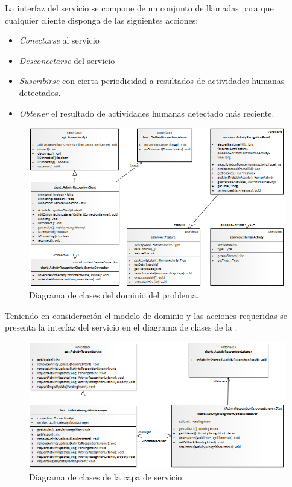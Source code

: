 La interfaz del servicio se compone de un conjunto de llamadas para
que cualquier cliente disponga de las siguientes acciones:
\begin{itemize}
\item \emph{Conectarse} al servicio
\item \emph{Desconectarse} del servicio
\item \emph{Suscribirse} con cierta periodicidad a resultados de actividades
humanas detectados. 
\item \emph{Obtener} el resultado de actividades humanas detectado más reciente.
\end{itemize}
\begin{figure}[H]
\begin{centering}
\includegraphics[width=1\columnwidth]{capitulo-5/graphics/class_domain}
\par\end{centering}
\caption[Diagrama de clases del dominio del problema]{\label{fig5:domain-model}Diagrama de clases del dominio del problema.}
\end{figure}

Teniendo en consideración el modelo de dominio y las acciones requeridas
se presenta la interfaz del servicio en el diagrama de clases de la
.

\begin{figure}[H]
\begin{centering}
\includegraphics[width=1\columnwidth]{capitulo-5/graphics/class_service}
\par\end{centering}
\caption[Diagrama de clases de la capa de servicio]{\label{fig5:service-layer}Diagrama de clases de la capa de servicio.}

\end{figure}

